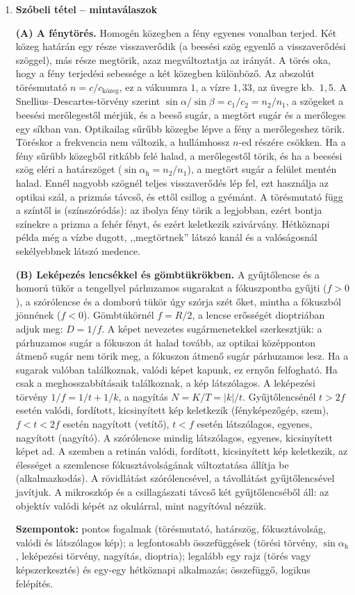 \documentclass[11pt,a4paper]{article}
\begin{document}
\begin{enumerate}
\item \textbf{Szóbeli tétel -- mintaválaszok}

  \textbf{(A) A fénytörés.} Homogén közegben a fény egyenes vonalban terjed. Két közeg
  határán egy része visszaverődik (a beesési szög egyenlő a visszaverődési szöggel), más része
  megtörik, azaz megváltoztatja az irányát. A törés oka, hogy a fény terjedési sebessége a két
  közegben különböző. Az abszolút törésmutató $n = c/c_\text{közeg}$, ez a vákuumra $1$, a
  vízre $1{,}33$, az üvegre kb.\ $1{,}5$. A Snellius--Descartes-törvény szerint
  $\sin\alpha/\sin\beta = c_1/c_2 = n_2/n_1$, a szögeket a beesési merőlegestől mérjük, és a
  beeső sugár, a megtört sugár és a merőleges egy síkban van. Optikailag sűrűbb közegbe
  lépve a fény a merőlegeshez törik. Töréskor a frekvencia nem változik, a hullámhossz
  $n$-ed részére csökken. Ha a fény sűrűbb közegből ritkább felé halad, a merőlegestől törik,
  és ha a beesési szög eléri a határszöget ($\sin\alpha_\text{h} = n_2/n_1$), a megtört sugár
  a felület mentén halad. Ennél nagyobb szögnél teljes visszaverődés lép fel, ezt használja
  az optikai szál, a prizmás távcső, és ettől csillog a gyémánt. A törésmutató függ a
  színtől is (színszóródás): az ibolya fény törik a legjobban, ezért bontja színekre a
  prizma a fehér fényt, és ezért keletkezik szivárvány. Hétköznapi példa még a vízbe
  dugott, ,,megtörtnek'' látszó kanál és a valóságosnál sekélyebbnek látszó medence.

  \textbf{(B) Leképezés lencsékkel és gömbtükrökben.} A gyűjtőlencse és a homorú tükör a
  tengellyel párhuzamos sugarakat a fókuszpontba gyűjti ($f > 0$), a szórólencse és a domború
  tükör úgy szórja szét őket, mintha a fókuszból jönnének ($f < 0$). Gömbtükörnél $f = R/2$,
  a lencse erősségét dioptriában adjuk meg: $D = 1/f$. A képet nevezetes sugármenetekkel
  szerkesztjük: a párhuzamos sugár a fókuszon át halad tovább, az optikai középponton átmenő
  sugár nem törik meg, a fókuszon átmenő sugár párhuzamos lesz. Ha a sugarak valóban
  találkoznak, valódi képet kapunk, ez ernyőn felfogható. Ha csak a meghosszabbításaik
  találkoznak, a kép látszólagos. A leképezési törvény $1/f = 1/t + 1/k$, a nagyítás
  $N = K/T = |k|/t$. Gyűjtőlencsénél $t > 2f$ esetén valódi, fordított, kicsinyített kép
  keletkezik (fényképezőgép, szem), $f < t < 2f$ esetén nagyított (vetítő), $t < f$ esetén
  látszólagos, egyenes, nagyított (nagyító). A szórólencse mindig látszólagos, egyenes,
  kicsinyített képet ad. A szemben a retinán valódi, fordított, kicsinyített kép keletkezik,
  az élességet a szemlencse fókusztávolságának változtatása állítja be (alkalmazkodás). A
  rövidlátást szórólencsével, a távollátást gyűjtőlencsével javítjuk. A mikroszkóp és a
  csillagászati távcső két gyűjtőlencséből áll: az objektív valódi képét az okulárral, mint
  nagyítóval nézzük.

  \medskip
  \textbf{Szempontok:} pontos fogalmak (törésmutató, határszög, fókusztávolság, valódi és
  látszólagos kép); a legfontosabb összefüggések (törési törvény, $\sin\alpha_\text{h}$,
  leképezési törvény, nagyítás, dioptria); legalább egy rajz (törés vagy képszerkesztés) és
  egy-egy hétköznapi alkalmazás; összefüggő, logikus felépítés.
\end{enumerate}
\end{document}
